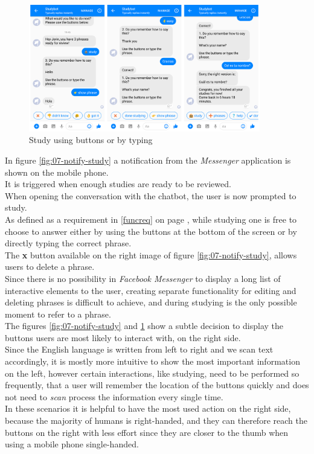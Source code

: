 \begin{figure}[h]
  \centering
  \includegraphics[width=0.9\textwidth]{images/interface/08-study-done.png}
	\caption{Study using buttons or by typing}
	\label{fig:08-study-done}
\end{figure}

In figure \ref{fig:07-notify-study} a notification from the \emph{Messenger} application is shown on the mobile phone.
\\
It is triggered when enough studies are ready to be reviewed.
\\
When opening the conversation with the chatbot,
the user is now prompted to study.
\\
As defined as a requirement in \ref{funcreq} on page \pageref{funcreq},
while studying one is free to choose to answer either by using the buttons at the bottom of the screen
or by directly typing the correct phrase.
\\

The \textbf{x} button available on the right image of figure \ref{fig:07-notify-study},
allows users to delete a phrase.
\\
Since there is no possibility in \emph{Facebook Messenger} to display a long list of interactive elements to the user,
creating separate functionality for editing and deleting phrases is difficult to achieve,
and during studying is the only possible moment to refer to a phrase.
\\

The figures \ref{fig:07-notify-study} and \ref{fig:08-study-done} show a subtle decision to display the buttons users are most likely to interact with,
on the right side.
\\
Since the English language is written from left to right and we scan text accordingly,
it is mostly more intuitive to show the most important information on the left,
however certain interactions, like studying, need to be performed so frequently,
that a user will remember the location of the buttons quickly and does not need to \emph{scan} process the information every single time.
\\
In these scenarios it is helpful to have the most used action on the right side, because the majority of humans is right-handed,
and they can therefore reach the buttons on the right with less effort since they are closer to the thumb when using a mobile phone single-handed.
\\

